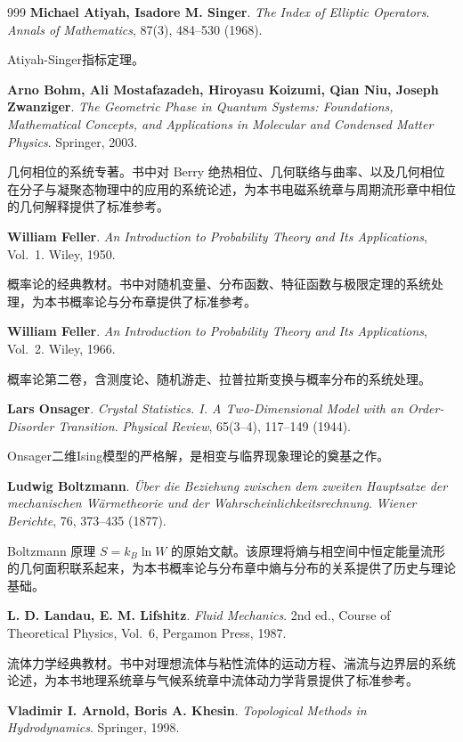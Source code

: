 \begin{thebibliography}{999}
 \textbf{Michael Atiyah, Isadore M. Singer}. \textit{The Index of Elliptic Operators}. \textit{Annals of Mathematics}, 87(3), 484--530 (1968).

Atiyah-Singer指标定理。

 \textbf{Arno Bohm, Ali Mostafazadeh, Hiroyasu Koizumi, Qian Niu, Joseph Zwanziger}. \textit{The Geometric Phase in Quantum Systems: Foundations, Mathematical Concepts, and Applications in Molecular and Condensed Matter Physics}. Springer, 2003.

几何相位的系统专著。书中对 Berry 绝热相位、几何联络与曲率、以及几何相位在分子与凝聚态物理中的应用的系统论述，为本书电磁系统章与周期流形章中相位的几何解释提供了标准参考。

 \textbf{William Feller}. \textit{An Introduction to Probability Theory and Its Applications}, Vol.~1. Wiley, 1950.

概率论的经典教材。书中对随机变量、分布函数、特征函数与极限定理的系统处理，为本书概率论与分布章提供了标准参考。

 \textbf{William Feller}. \textit{An Introduction to Probability Theory and Its Applications}, Vol.~2. Wiley, 1966.

概率论第二卷，含测度论、随机游走、拉普拉斯变换与概率分布的系统处理。

 \textbf{Lars Onsager}. \textit{Crystal Statistics. I. A Two-Dimensional Model with an Order-Disorder Transition}. \textit{Physical Review}, 65(3--4), 117--149 (1944).

Onsager二维Ising模型的严格解，是相变与临界现象理论的奠基之作。

 \textbf{Ludwig Boltzmann}. \textit{\"Uber die Beziehung zwischen dem zweiten Hauptsatze der mechanischen W\"armetheorie und der Wahrscheinlichkeitsrechnung}. \textit{Wiener Berichte}, 76, 373--435 (1877).

Boltzmann 原理 $S = k_B \ln W$ 的原始文献。该原理将熵与相空间中恒定能量流形的几何面积联系起来，为本书概率论与分布章中熵与分布的关系提供了历史与理论基础。

 \textbf{L. D. Landau, E. M. Lifshitz}. \textit{Fluid Mechanics}. 2nd ed., Course of Theoretical Physics, Vol.~6, Pergamon Press, 1987.

流体力学经典教材。书中对理想流体与粘性流体的运动方程、湍流与边界层的系统论述，为本书地理系统章与气候系统章中流体动力学背景提供了标准参考。

 \textbf{Vladimir I. Arnold, Boris A. Khesin}. \textit{Topological Methods in Hydrodynamics}. Springer, 1998.


\end{thebibliography}
